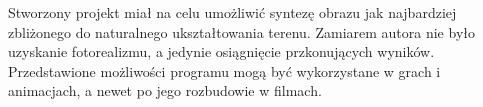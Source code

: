 Stworzony projekt miał na celu umożliwić syntezę obrazu jak najbardziej zbliżonego do naturalnego ukształtowania terenu. Zamiarem autora nie było uzyskanie fotorealizmu, a jedynie osiągnięcie przkonujących wyników. Przedstawione możliwości programu mogą być wykorzystane w grach i animacjach, a newet po jego rozbudowie w filmach.



